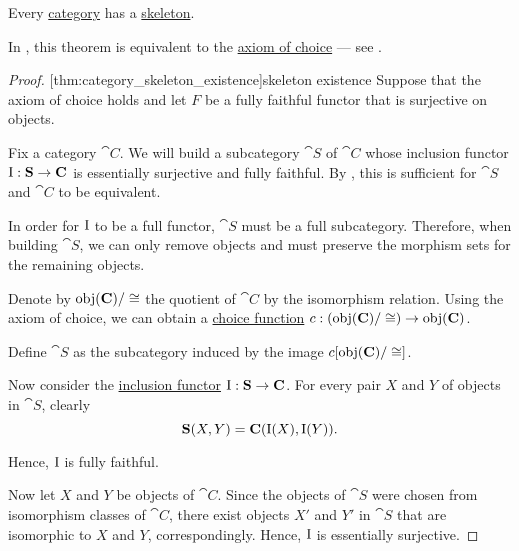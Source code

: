\begin{theorem}\label{thm:category_skeleton_existence}
  Every \hyperref[def:category]{category} has a \hyperref[def:skeletal_category]{skeleton}.
\end{theorem}
\begin{comments}
  \item In \hyperref[def:zfc]{}, this theorem is equivalent to the \hyperref[def:zfc/choice]{axiom of choice} --- see .
\end{comments}
\begin{proof}
  [thm:category_skeleton_existence]{skeleton existence} Suppose that the axiom of choice holds and let \( F \) be a fully faithful functor that is surjective on objects.

  Fix a category \( \cat{C} \). We will build a subcategory \( \cat{S} \) of \( \cat{C} \) whose inclusion functor \( \operatorname{I}: \operatorname{\mathbf{S}} \to \operatorname{\mathbf{C}} \) is essentially surjective and fully faithful. By , this is sufficient for \( \cat{S} \) and \( \cat{C} \) to be equivalent.

  In order for \( \operatorname{I} \) to be a full functor, \( \cat{S} \) must be a full subcategory. Therefore, when building \( \cat{S} \), we can only remove objects and must preserve the morphism sets for the remaining objects.

  Denote by \( \operatorname{obj}(\operatorname{\mathbf{C}}) / \cong \) the quotient of \( \cat{C} \) by the isomorphism relation. Using the axiom of choice, we can obtain a \hyperref[def:choice_function]{choice function} \( c: (\operatorname{obj}(\operatorname{\mathbf{C}}) / \cong) \to \operatorname{obj}(\operatorname{\mathbf{C}}) \).

  Define \( \cat{S} \) as the subcategory induced by the image \( c[\operatorname{obj}(\operatorname{\mathbf{C}}) / \cong] \).

  Now consider the \hyperref[def:subcategory]{inclusion functor} \( \operatorname{I}: \operatorname{\mathbf{S}} \to \operatorname{\mathbf{C}} \). For every pair \( X \) and \( Y \) of objects in \( \cat{S} \), clearly
  \begin{equation*}
    \operatorname{\mathbf{S}}(X, Y) = \operatorname{\mathbf{C}}(\operatorname{I}(X), \operatorname{I}(Y)).
  \end{equation*}

  Hence, \( \operatorname{I} \) is fully faithful.

  Now let \( X \) and \( Y \) be objects of \( \cat{C} \). Since the objects of \( \cat{S} \) were chosen from isomorphism classes of \( \cat{C} \), there exist objects \( X' \) and \( Y' \) in \( \cat{S} \) that are isomorphic to \( X \) and \( Y \), correspondingly. Hence, \( \operatorname{I} \) is essentially surjective.


\end{proof}
